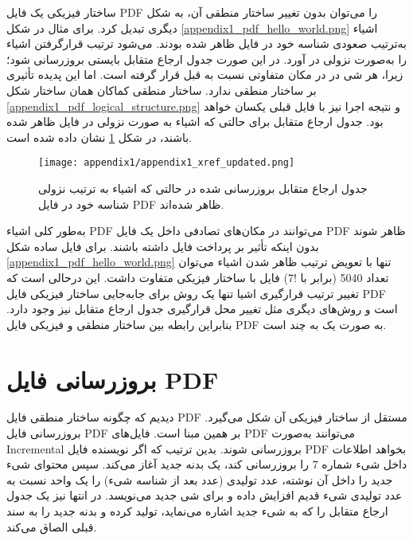 ساختار فیزیکی یک فایل \gls{PDF}
 را می‌توان بدون تغییر ساختار منطقی آن، به شکل دیگری تبدیل کرد. برای مثال در شکل \ref{appendix1_pdf_hello_world.png} اشیاء به‌ترتیب صعودی شناسه خود در فایل ظاهر شده بودند. می‌‌شود ترتیب قرارگرفتن اشیاء را به‌صورت نزولی در آورد. در این صورت جدول ارجاع متقابل بایستی بروزرسانی شود؛ زیرا، هر شی در در مکان متفاوتی نسبت به قبل قرار گرفته است. اما این پدیده تأثیری بر ساختار منطقی ندارد. ساختار منطقی کماکان همان ساختار ‏شکل \ref{appendix1_pdf_logical_structure.png} و نتیجه اجرا نیز با فایل قبلی یکسان خواهد بود. جدول ارجاع متقابل برای حالتی که اشیاء به صورت نزولی در فایل ظاهر شده باشند، در ‏شکل \ref{appendix1_xref_updated.png} نشان داده شده است.



\begin{figure}%
	\centering
	\texttt{[image: appendix1/appendix1\_xref\_updated.png]}
	\caption[جدول ارجاع متقابل بروزرسانی شده یک فایل \gls*{PDF}]
	{
		جدول ارجاع متقابل بروزرسانی شده در حالتی که اشیاء به ترتیب نزولی شناسه خود در فایل \gls*{PDF}
		 ظاهر شده‌اند.
	}
	\label{appendix1_xref_updated.png}
\end{figure}



به‌طور کلی اشیاء \gls{PDF}
می‌توانند در مکان‌های تصادفی داخل یک فایل \gls{PDF}
 ظاهر شوند بدون اینکه تأثیر بر پرداخت فایل داشته باشند. برای فایل ساده ‏شکل \ref{appendix1_pdf_hello_world.png} تنها با تعویض ترتیب ظاهر شدن اشیاء می‌توان تعداد 5040 (برابر با !7) فایل با ساختار فیزیکی متفاوت داشت. این درحالی است که تغییر ترتیب قرارگیری اشیا تنها یک روش برای جابه‌جایی ساختار فیزیکی فایل \gls{PDF}
  است و روش‌های دیگری مثل تغییر محل قرارگیری جدول ارجاع متقابل نیز وجود دارد. بنابراین رابطه بین ساختار منطقی و فیزیکی فایل \gls{PDF}
  به صورت یک به چند است.

\section{بروزرسانی فایل PDF}

دیدیم که چگونه ساختار منطقی فایل \gls{PDF}
مستقل از ساختار فیزیکی آن شکل می‌گیرد. بروزرسانی فایل \gls{PDF}
 بر همین مبنا است. فایل‌های \gls{PDF}
 می‌توانند به‌صورت \gls{Incremental} بروزرسانی شوند. بدین ترتیب که اگر نویسنده فایل \gls{PDF}
  بخواهد اطلاعات داخل شیء شماره 7 را بروزرسانی کند، یک بدنه جدید آغاز می‌کند. سپس محتوای شیء جدید را داخل آن نوشته، عدد تولیدی (عدد بعد از شناسه شیء) را یک واحد نسبت به عدد تولیدی شیء قدیم افزایش داده و برای شی جدید می‌نویسد. در  انتها نیز یک جدول ارجاع متقابل را که به شیء جدید اشاره می‌نماید، تولید کرده و بدنه جدید را به سند قبلی الصاق می‌کند.













